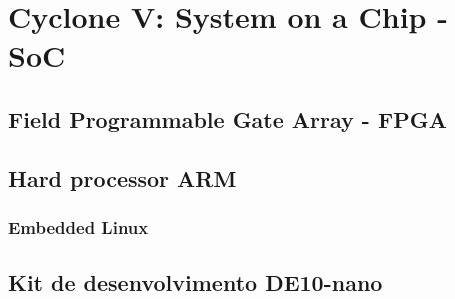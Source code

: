 \chapter{Cyclone V: System on a Chip - SoC}\label{cap:soc}


\section{Field Programmable Gate Array - FPGA}

\section{Hard processor ARM}

\subsection{Embedded Linux}

\section{Kit de desenvolvimento DE10-nano}